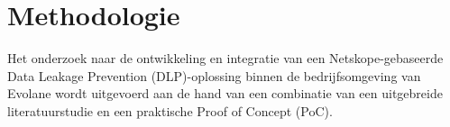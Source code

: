 



\section{Methodologie}%
\label{sec:methodologie}

Het onderzoek naar de ontwikkeling en integratie van een Netskope-gebaseerde Data Leakage Prevention (DLP)-oplossing binnen 
de bedrijfsomgeving van Evolane wordt uitgevoerd aan de hand van een combinatie van een uitgebreide literatuurstudie en een praktische Proof of Concept (PoC).



